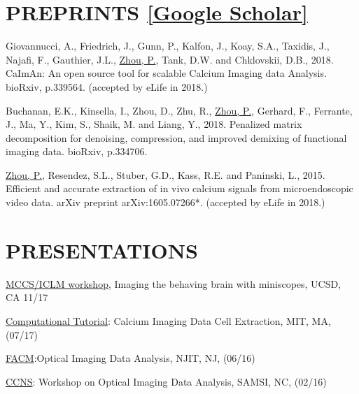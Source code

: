 \documentclass[paper=letter,fontsize=11pt]{scrartcl} %
\newcommand{\NewPart}[2]{\section*{\uppercase{#1} #2}}
\newcommand{\TalkEntry}[4]{
		\noindent #1, #2, #3 #4}
\begin{document}
\NewPart{Preprints}{\href{http://scholar.google.com/citations?hl=en&user=hw0JvzAAAAAJ}{[Google Scholar]}}

\begin{etaremune}

\item Giovannucci, A., Friedrich, J., Gunn, P., Kalfon, J., Koay, S.A., Taxidis, J., Najafi, F., Gauthier, J.L., \ul{Zhou, P.}, Tank, D.W. and Chklovskii, D.B., 2018. CaImAn: An open source tool for scalable Calcium Imaging data Analysis. bioRxiv, p.339564. ({\color{blue}accepted by eLife in 2018}.)

\item Buchanan, E.K., Kinsella, I., Zhou, D., Zhu, R., \ul{Zhou, P.}, Gerhard, F., Ferrante, J., Ma, Y., Kim, S., Shaik, M. and Liang, Y., 2018. Penalized matrix decomposition for denoising, compression, and improved demixing of functional imaging data. bioRxiv, p.334706.

\item \ul{Zhou, P.}, Resendez, S.L., Stuber, G.D., Kass, R.E. and Paninski, L., 2015. Efficient and accurate extraction of in vivo calcium signals from microendoscopic video data. arXiv preprint arXiv:1605.07266*. ({\color{blue}accepted by eLife in 2018}.)
\end{etaremune}







\NewPart{Presentations}{}
\begin{etaremune}
\item \TalkEntry{\href{http://www.silvalab.org/page/MiniscopeWorkshop.html}{ MCCS/ICLM workshop}}{ Imaging the behaving brain with miniscopes}{UCSD, CA}{11/17}%
\item \TalkEntry{\href{https://bcs.mit.edu/news-events/events/computational-tutorial-calcium-imaging-data-cell-extraction}{Computational Tutorial}: Calcium Imaging Data Cell Extraction}{MIT, MA}{(07/17)}%
\item\TalkEntry{\href{https://m.njit.edu/Events/FACM16/program.html}{FACM}:Optical Imaging Data Analysis}{NJIT, NJ}{(06/16)}%

\item\TalkEntry{\href{https://www.samsi.info/programs-and-activities/research-workshops/2015-16-ccns-workshop-on-optical-imaging-data-analysis-february-1-2-2016/}{CCNS}: Workshop on Optical Imaging Data Analysis}{SAMSI, NC}{(02/16)}%

\end{etaremune}
\end{document}
